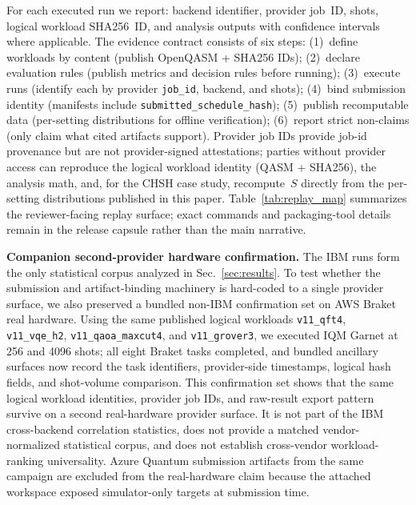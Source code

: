 \documentclass[aps,prxquantum,twocolumn,superscriptaddress,amsmath,amssymb,longbibliography,floatfix]{revtex4-2}
\begin{document}
For each executed run we report: backend identifier, provider job~ID, shots, logical workload SHA256~ID, and analysis outputs with confidence intervals where applicable. The evidence contract consists of six steps: (1)~define workloads by content (publish OpenQASM + SHA256 IDs); (2)~declare evaluation rules (publish metrics and decision rules before running); (3)~execute runs (identify each by provider \texttt{job\_id}, backend, and shots); (4)~bind submission identity (manifests include \texttt{submitted\_schedule\_hash}); (5)~publish recomputable data (per-setting distributions for offline verification); (6)~report strict non-claims (only claim what cited artifacts support). Provider job IDs provide job-id provenance but are not provider-signed attestations; parties without provider access can reproduce the logical workload identity (QASM + SHA256), the analysis math, and, for the CHSH case study, recompute~$S$ directly from the per-setting distributions published in this paper. Table~\ref{tab:replay_map} summarizes the reviewer-facing replay surface; exact commands and packaging-tool details remain in the release capsule rather than the main narrative.

\textbf{Companion second-provider hardware confirmation.} The IBM runs form the only statistical corpus analyzed in Sec.~\ref{sec:results}. To test whether the submission and artifact-binding machinery is hard-coded to a single provider surface, we also preserved a bundled non-IBM confirmation set on AWS Braket real hardware. Using the same published logical workloads \texttt{v11\_qft4}, \texttt{v11\_vqe\_h2}, \texttt{v11\_qaoa\_maxcut4}, and \texttt{v11\_grover3}, we executed IQM Garnet at 256 and 4096 shots; all eight Braket tasks completed, and bundled ancillary surfaces now record the task identifiers, provider-side timestamps, logical hash fields, and shot-volume comparison. This confirmation set shows that the same logical workload identities, provider job IDs, and raw-result export pattern survive on a second real-hardware provider surface. It is not part of the IBM cross-backend correlation statistics, does not provide a matched vendor-normalized statistical corpus, and does not establish cross-vendor workload-ranking universality. Azure Quantum submission artifacts from the same campaign are excluded from the real-hardware claim because the attached workspace exposed simulator-only targets at submission time.
\end{document}
